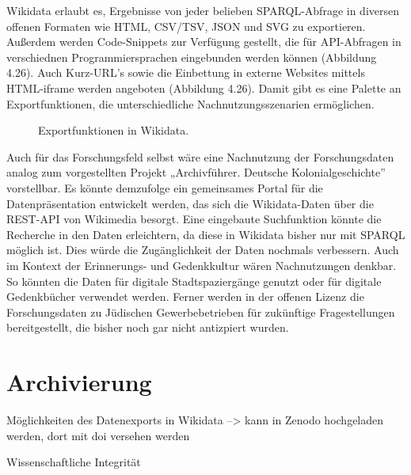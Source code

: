 Wikidata erlaubt es, Ergebnisse von jeder belieben SPARQL-Abfrage in diversen offenen Formaten wie HTML, CSV/TSV, JSON und SVG zu exportieren. Außerdem werden Code-Snippets zur Verfügung gestellt, die für API-Abfragen in verschiednen Programmiersprachen eingebunden werden können (Abbildung 4.26). Auch Kurz-URL's sowie die Einbettung in externe Websites mittels HTML-iframe werden angeboten (Abbildung 4.26). Damit gibt es eine Palette an Exportfunktionen, die unterschiedliche Nachnutzungsszenarien ermöglichen.

\begin{figure}[h]
    \centering
    \caption{Exportfunktionen in Wikidata.}
    \label{fig:x cubed graph}
\end{figure}

Auch für das Forschungsfeld selbst wäre eine Nachnutzung der Forschungsdaten analog zum vorgestellten Projekt „Archivführer. Deutsche Kolonialgeschichte'' vorstellbar. Es könnte demzufolge ein gemeinsames Portal für die Datenpräsentation entwickelt werden, das sich die Wikidata-Daten über die REST-API von Wikimedia besorgt. Eine eingebaute Suchfunktion könnte die Recherche in den Daten erleichtern, da diese in Wikidata bisher nur mit SPARQL möglich ist. Dies würde die Zugänglichkeit der Daten nochmals verbessern. Auch im Kontext der Erinnerungs- und Gedenkkultur wären Nachnutzungen denkbar. So könnten die Daten für digitale Stadtspaziergänge genutzt oder für digitale Gedenkbücher verwendet werden. Ferner werden in der offenen Lizenz die Forschungsdaten zu Jüdischen Gewerbebetrieben für zukünftige Fragestellungen bereitgestellt, die bisher noch gar nicht antizpiert wurden.

\section{Archivierung}
Möglichkeiten des Datenexports in Wikidata --> kann in Zenodo hochgeladen werden, dort mit doi versehen werden

Wissenschaftliche Integrität